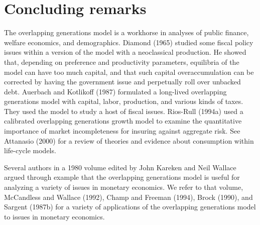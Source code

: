 \section{Concluding remarks}
The overlapping generations model is a workhorse in
analyses of  public finance, welfare economics,
and demographics.  Diamond (1965) studied
some fiscal policy issues within a version of the model with a neoclassical production.
He showed that, depending on preference and productivity
parameters, equilibria of the model can
 have too much capital, and that such capital
overaccumulation can be corrected by having the government
issue and perpetually roll over unbacked debt.
Auerbach  and  Kotlikoff (1987)  formulated a long-lived overlapping
generations model with capital, labor, production, and
various kinds of taxes. They used the model to study
a host of fiscal issues. Rios-Rull (1994a) used a calibrated
overlapping generations growth model to examine
the quantitative importance of market incompleteness for
insuring against aggregate risk. See Attanasio (2000) for
a  review of theories and evidence
about consumption within life-cycle models.

Several authors in a 1980 volume edited by John Kareken
and Neil Wallace argued through example that the overlapping
generations model is useful for analyzing a variety of issues in
monetary economics.  We refer to that volume, McCandless
and Wallace (1992), Champ and Freeman (1994), Brock (1990),
and Sargent (1987b) for a variety of applications
of the overlapping generations model to issues in monetary
economics.

\showchaptIDfalse
\showsectIDfalse
